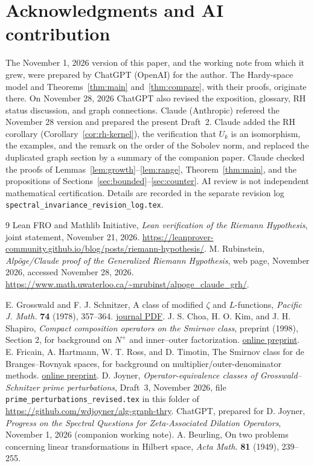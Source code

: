 \documentclass[12pt,letterpaper]{article}
\theoremstyle{remark}
\numberwithin{equation}{section}
\begin{document}
\section*{Acknowledgments and AI contribution}
The November 1, 2026 version of this paper, and the working note
\cite{JoynerNote} from which it grew, were prepared by ChatGPT (OpenAI)
for the author.  The Hardy-space model and Theorems~\ref{thm:main}
and~\ref{thm:compare}, with their proofs, originate there.  On
November 28, 2026 ChatGPT also
revised the exposition, glossary, RH status discussion, and graph
connections.  Claude (Anthropic) refereed the November 28 version and
prepared the present Draft~2.  Claude added the RH corollary
(Corollary~\ref{cor:rh-kernel}), the verification that $U_k$ is an
isomorphism, the examples, and the remark on the order of the Sobolev
norm, and replaced the duplicated graph section by a summary of the
companion paper.  Claude checked the proofs of
Lemmas~\ref{lem:growth}--\ref{lem:range}, Theorem~\ref{thm:main}, and
the propositions of Sections~\ref{sec:bounded}--\ref{sec:counter}.
AI review is not independent mathematical certification.  Details are
recorded in the separate revision log
\texttt{spectral\_invariance\_revision\_log.tex}.

\begin{thebibliography}{9} Lean FRO and Mathlib Initiative,
\emph{Lean verification of the Riemann Hypothesis},
joint statement, November 21, 2026.
\url{https://leanprover-community.github.io/blog/posts/riemann-hypothesis/}.
 M. Rubinstein,
\emph{Alp\"oge/Claude proof of the Generalized Riemann Hypothesis},
web page, November 2026, accessed November 28, 2026.
\url{https://www.math.uwaterloo.ca/~mrubinst/alpoge_claude_grh/}.

 E. Grosswald and F. J. Schnitzer, A class of modified $\zeta$ and $L$-functions, \emph{Pacific J. Math.} \textbf{74} (1978), 357--364. \href{https://msp.org/pjm/1978/74-2/pjm-v74-n2-p09-s.pdf}{journal PDF}.
 J. S. Choa, H. O. Kim, and J. H. Shapiro, \emph{Compact composition operators on the Smirnov class}, preprint (1998), Section 2, for background on $N^+$ and inner--outer factorization. \href{https://users.math.msu.edu/users/shapiro/pubvit/Downloads/Smirnov/Smirnov.pdf}{online preprint}.
 E. Fricain, A. Hartmann, W. T. Ross, and D. Timotin, The Smirnov class for de Branges--Rovnyak spaces, for background on multiplier/outer-denominator methods. \href{https://pro.univ-lille.fr/fileadmin/user_upload/pages/pros/emmanuel_fricain/Smirnov-Hb-version-soumise-Result.pdf}{online preprint}.
 D. Joyner, \emph{Operator-equivalence classes of Grosswald--Schnitzer prime perturbations}, Draft~3, November 2026, file \texttt{prime\_perturbations\_revised.tex} in this folder of \url{https://github.com/wdjoyner/alg-graph-thry}.
 ChatGPT, prepared for D. Joyner, \emph{Progress on the Spectral Questions for Zeta-Associated Dilation Operators}, November 1, 2026 (companion working note).
 A. Beurling, On two problems concerning linear transformations in Hilbert space, \emph{Acta Math.} \textbf{81} (1949), 239--255.
\end{thebibliography}
\end{document}
